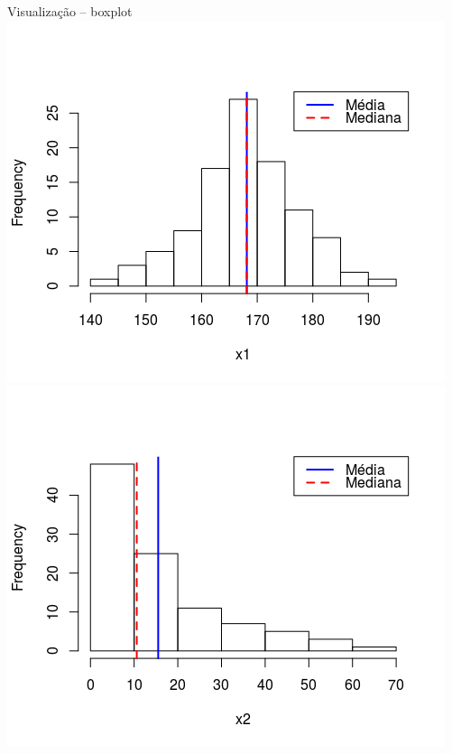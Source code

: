 \documentclass{beamer}
\begin{document}
\begin{frame}{\scriptsize Visualização -- boxplot}
  \centering
  \includegraphics[height=.5\textheight]{Cap37-38/normal2-h}
  \includegraphics[height=.5\textheight]{Cap37-38/lognormal2-h}


\end{frame}
\end{document}
